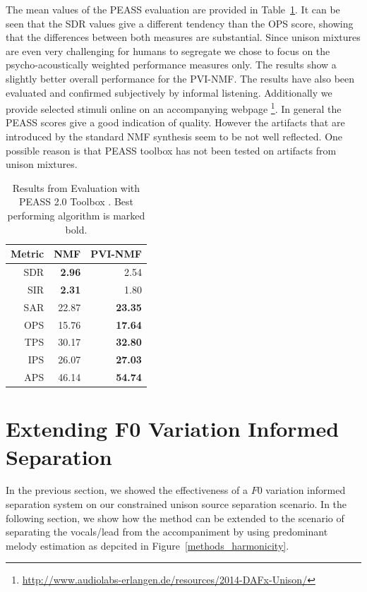 The mean values of the PEASS evaluation are provided in Table~\ref{tab:results}. It can be seen that the SDR values give a different tendency than the OPS score, showing that the differences between both measures are substantial. Since unison mixtures are even very challenging for humans to segregate we chose to focus on the psycho-acoustically weighted performance measures only. The results show a slightly better overall performance for the PVI-NMF.
The results have also been evaluated and confirmed subjectively by informal listening. Additionally we provide selected stimuli online on an accompanying webpage \footnote{\url{http://www.audiolabs-erlangen.de/resources/2014-DAFx-Unison/}}. In general the PEASS scores give a good indication of quality. However the artifacts that are introduced by the standard NMF synthesis seem to be not well reflected. One possible reason is that PEASS toolbox has not been tested on artifacts from unison mixtures. \\

\begin{table}
\begin{center}
\small
\begin{tabular}{ r | r r }
  Metric & NMF & PVI-NMF \\
  \hline
  SDR & \textbf{2.96} & 2.54 \\
  SIR & \textbf{2.31} & 1.80 \\
  SAR & 22.87 & \textbf{23.35} \\
  \hline
  OPS & 15.76 & \textbf{17.64}\\
  TPS & 30.17 & \textbf{32.80}\\
  IPS & 26.07 & \textbf{27.03}\\
  APS & 46.14 & \textbf{54.74}\\
\end{tabular}
\end{center}
  \caption{Results from Evaluation with PEASS 2.0 Toolbox \cite{emiya11}. Best performing algorithm is marked bold.}
  \label{tab:results}
\end{table}

\section{Extending F0 Variation Informed Separation}


In the previous section, we showed the effectiveness of a \(F0\) variation informed separation system on our constrained unison source separation scenario.
In the following section, we show how the method can be extended to the scenario of separating the vocals/lead from the accompaniment by using predominant melody estimation as depcited in Figure~\ref{methods_harmonicity}.

